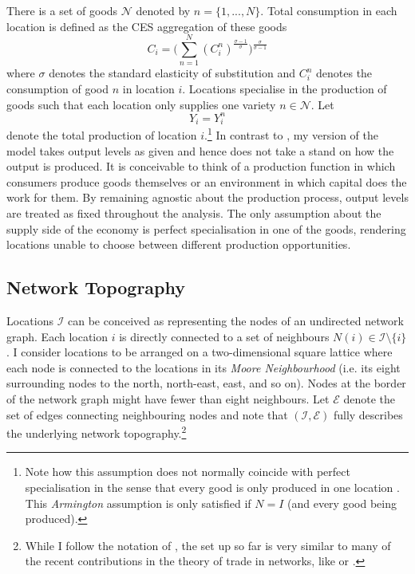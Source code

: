 \documentclass[11pt, oneside]{article}   	%
\begin{document}
There is a set of goods $\mathcal{N}$ denoted by $n =\{ 1,...,N\}$. Total consumption in each location is defined as the CES aggregation of these goods
\begin{equation*}
  C_{i} = \bigg( \sum_{n=1}^{N} (C_{i}^{n})^{\frac{\sigma-1}{\sigma}}\bigg)^{\frac{\sigma}{\sigma-1}}
\end{equation*}
where $\sigma$ denotes the standard elasticity of substitution and $C_{i}^{n}$ denotes the consumption of good $n$ in location $i$. Locations specialise in the production of goods such that each location only supplies one variety $n \in \mathcal{N}$. Let
\begin{equation*}
  Y_{i} = Y_{i}^{n}
\end{equation*}
denote the total production of location $i$.\footnote{Note how this assumption does not normally coincide with perfect specialisation in the sense that every good is only produced in one location \citep[as in e.g.][]{Anderson_Gravitygravitassolution_2003}. This \emph{Armington} assumption is only satisfied if $N=I$ (and every good being produced).} In contrast to \citeauthor{Fajgelbaum_OptimalTransportNetworks_2017}, my version of the model takes output levels as given and hence does not take a stand on how the output is produced. It is conceivable to think of a production function in which consumers produce goods themselves or an environment in which capital does the work for them. By remaining agnostic about the production process, output levels are treated as fixed throughout the analysis. The only assumption about the supply side of the economy is perfect specialisation in one of the goods, rendering locations unable to choose between different production opportunities.

\subsection{Network Topography}
Locations $\mathcal{I}$ can be conceived as representing the nodes of an undirected network graph. Each location $i$ is directly connected to a set of neighbours $N(i) \in \mathcal{I} \setminus \{ i\}$. I consider locations to be arranged on a two-dimensional square lattice where each node is connected to the locations in its \emph{Moore Neighbourhood} (i.e. its eight surrounding nodes to the north, north-east, east, and so on). Nodes at the border of the network graph might have fewer than eight neighbours. Let $\mathcal{E}$ denote the set of edges connecting neighbouring nodes and note that $(\mathcal{I}, \mathcal{E})$ fully describes the underlying network topography.\footnote{While I follow the notation of \cite{Fajgelbaum_OptimalTransportNetworks_2017}, the set up so far is very similar to many of the recent contributions in the theory of trade in networks, like \cite{Allen_WelfareEffectsTransportation_2016} or \cite{Galichon_OptimalTransportMethods_2016}.}
\end{document}
